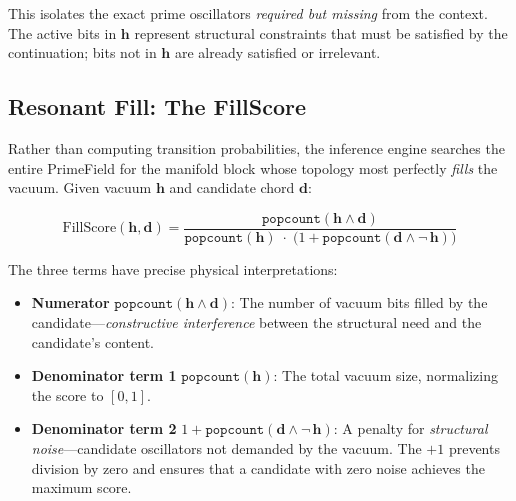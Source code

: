 This isolates the exact prime oscillators \emph{required but missing} from
the context.  The active bits in $\mathbf{h}$ represent structural
constraints that must be satisfied by the continuation; bits not in
$\mathbf{h}$ are already satisfied or irrelevant.

\subsection{Resonant Fill: The FillScore}
\label{sec:resonant_fill}

Rather than computing transition probabilities, the inference engine
searches the entire PrimeField for the manifold block whose topology most
perfectly \emph{fills} the vacuum.  Given vacuum $\mathbf{h}$ and
candidate chord $\mathbf{d}$:

\begin{equation}
  \text{FillScore}(\mathbf{h}, \mathbf{d}) =
    \frac{\texttt{popcount}(\mathbf{h} \land \mathbf{d})}
         {\texttt{popcount}(\mathbf{h})
          \;\cdot\;
          \bigl(1 + \texttt{popcount}(\mathbf{d} \land \lnot\,\mathbf{h})\bigr)}
  \label{eq:fill_score}
\end{equation}

\noindent The three terms have precise physical interpretations:

\begin{itemize}[nosep]
  \item \textbf{Numerator} $\texttt{popcount}(\mathbf{h} \land \mathbf{d})$:
        The number of vacuum bits filled by the candidate---\emph{constructive
        interference} between the structural need and the candidate's content.
  \item \textbf{Denominator term 1} $\texttt{popcount}(\mathbf{h})$:
        The total vacuum size, normalizing the score to $[0, 1]$.
  \item \textbf{Denominator term 2}
        $1 + \texttt{popcount}(\mathbf{d} \land \lnot\,\mathbf{h})$:
        A penalty for \emph{structural noise}---candidate oscillators not
        demanded by the vacuum.  The $+1$ prevents division by zero and
        ensures that a candidate with zero noise achieves the maximum score.
\end{itemize}


